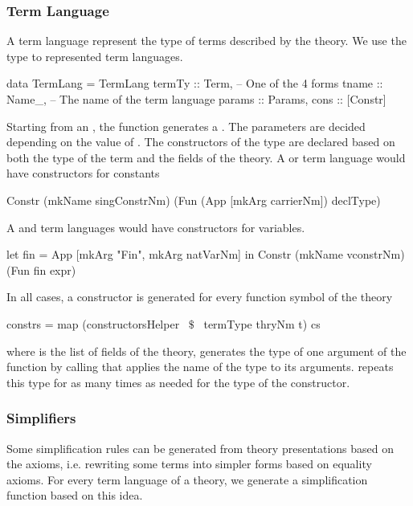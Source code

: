 \subsubsection{Term Language}
\label{subsec:term_lang}
A term language represent the type of terms described by the theory. We use the  type to represented term languages.  
\begin{hscode}
data TermLang = TermLang {
  termTy  :: Term,  -- One of the 4 forms 
  tname   :: Name_, -- The name of the term language 
  params  :: Params,
  cons    :: [Constr] }
\end{hscode}
Starting from an , the function  generates a . The parameters are decided depending on the value of . The constructors of the type are declared based on both the type of the term and the fields of the theory. A  or  term language would have constructors for constants
\begin{hscode} 
Constr (mkName singConstrNm)
    (Fun (App [mkArg carrierNm]) declType)
\end{hscode} 
A  and  term languages would have constructors for variables. 
\begin{hscode} 
 let fin = App [mkArg "Fin", mkArg natVarNm]
 in Constr (mkName vconstrNm) (Fun fin expr) 
\end{hscode} 
In all cases, a constructor is generated for every function symbol of the theory 
\begin{hscode} 
constrs = map (constructorsHelper ~$\$$~ termType thryNm t) cs
\end{hscode} 
where  is the list of fields of the theory, 
  generates the type of one argument of the function by calling  that applies the name of the type to its arguments.
 repeats this type for as many times as needed for the type of the constructor. 

\subsubsection{Simplifiers}
\label{sec:generation:simplifier}
Some simplification rules can be generated from theory presentations based on the axioms, i.e. rewriting some terms into simpler forms based on equality axioms. For every term language of a theory, we generate a simplification function based on this idea. 

